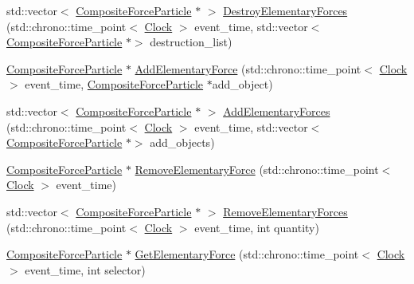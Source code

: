 \begin{DoxyCompactItemize}
\item 
std\+::vector$<$ \mbox{\hyperlink{class_composite_force_particle}{Composite\+Force\+Particle}} $\ast$ $>$ \mbox{\hyperlink{class_composite_force_particle_af07d8607737f7881aac6314313d800e3}{Destroy\+Elementary\+Forces}} (std\+::chrono\+::time\+\_\+point$<$ \mbox{\hyperlink{universe_8h_a0ef8d951d1ca5ab3cfaf7ab4c7a6fd80}{Clock}} $>$ event\+\_\+time, std\+::vector$<$ \mbox{\hyperlink{class_composite_force_particle}{Composite\+Force\+Particle}} $\ast$$>$ destruction\+\_\+list)
\item 
\mbox{\hyperlink{class_composite_force_particle}{Composite\+Force\+Particle}} $\ast$ \mbox{\hyperlink{class_composite_force_particle_aed3a7ebcb98626c564dde2d54d45ff03}{Add\+Elementary\+Force}} (std\+::chrono\+::time\+\_\+point$<$ \mbox{\hyperlink{universe_8h_a0ef8d951d1ca5ab3cfaf7ab4c7a6fd80}{Clock}} $>$ event\+\_\+time, \mbox{\hyperlink{class_composite_force_particle}{Composite\+Force\+Particle}} $\ast$add\+\_\+object)
\item 
std\+::vector$<$ \mbox{\hyperlink{class_composite_force_particle}{Composite\+Force\+Particle}} $\ast$ $>$ \mbox{\hyperlink{class_composite_force_particle_ad0e97ed38272c7861d162afdf0db33c7}{Add\+Elementary\+Forces}} (std\+::chrono\+::time\+\_\+point$<$ \mbox{\hyperlink{universe_8h_a0ef8d951d1ca5ab3cfaf7ab4c7a6fd80}{Clock}} $>$ event\+\_\+time, std\+::vector$<$ \mbox{\hyperlink{class_composite_force_particle}{Composite\+Force\+Particle}} $\ast$$>$ add\+\_\+objects)
\item 
\mbox{\hyperlink{class_composite_force_particle}{Composite\+Force\+Particle}} $\ast$ \mbox{\hyperlink{class_composite_force_particle_afe5738b3ba1382dad085fa1ef39963b3}{Remove\+Elementary\+Force}} (std\+::chrono\+::time\+\_\+point$<$ \mbox{\hyperlink{universe_8h_a0ef8d951d1ca5ab3cfaf7ab4c7a6fd80}{Clock}} $>$ event\+\_\+time)
\item 
std\+::vector$<$ \mbox{\hyperlink{class_composite_force_particle}{Composite\+Force\+Particle}} $\ast$ $>$ \mbox{\hyperlink{class_composite_force_particle_a1bfa61cec4f5a8436c1a188312ba8f45}{Remove\+Elementary\+Forces}} (std\+::chrono\+::time\+\_\+point$<$ \mbox{\hyperlink{universe_8h_a0ef8d951d1ca5ab3cfaf7ab4c7a6fd80}{Clock}} $>$ event\+\_\+time, int quantity)
\item 
\mbox{\hyperlink{class_composite_force_particle}{Composite\+Force\+Particle}} $\ast$ \mbox{\hyperlink{class_composite_force_particle_a63b3daf44517c90bb805b6612dd26acc}{Get\+Elementary\+Force}} (std\+::chrono\+::time\+\_\+point$<$ \mbox{\hyperlink{universe_8h_a0ef8d951d1ca5ab3cfaf7ab4c7a6fd80}{Clock}} $>$ event\+\_\+time, int selector)

\end{DoxyCompactItemize}
